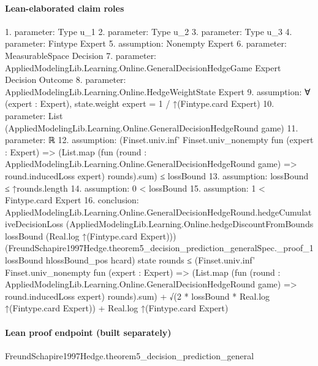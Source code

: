 \documentclass[10pt]{article}
\begin{document}
\paragraph{Lean-elaborated claim roles}\begin{ReviewVerbatim}
1. parameter: Type u_1
2. parameter: Type u_2
3. parameter: Type u_3
4. parameter: Fintype Expert
5. assumption: Nonempty Expert
6. parameter: MeasurableSpace Decision
7. parameter: AppliedModelingLib.Learning.Online.GeneralDecisionHedgeGame Expert Decision Outcome
8. parameter: AppliedModelingLib.Learning.Online.HedgeWeightState Expert
9. assumption: ∀ (expert : Expert), state.weight expert = 1 / ↑(Fintype.card Expert)
10. parameter: List (AppliedModelingLib.Learning.Online.GeneralDecisionHedgeRound game)
11. parameter: ℝ
12. assumption: (Finset.univ.inf' Finset.univ_nonempty fun (expert : Expert) =>
    (List.map
        (fun (round : AppliedModelingLib.Learning.Online.GeneralDecisionHedgeRound game) => round.inducedLoss expert)
        rounds).sum) ≤
  lossBound
13. assumption: lossBound ≤ ↑rounds.length
14. assumption: 0 < lossBound
15. assumption: 1 < Fintype.card Expert
16. conclusion: AppliedModelingLib.Learning.Online.GeneralDecisionHedgeRound.hedgeCumulativeDecisionLoss
    (AppliedModelingLib.Learning.Online.hedgeDiscountFromBounds lossBound (Real.log ↑(Fintype.card Expert)))
    (FreundSchapire1997Hedge.theorem5_decision_prediction_generalSpec._proof_1 lossBound hlossBound_pos hcard) state
    rounds ≤
  (Finset.univ.inf' Finset.univ_nonempty fun (expert : Expert) =>
        (List.map
            (fun (round : AppliedModelingLib.Learning.Online.GeneralDecisionHedgeRound game) =>
              round.inducedLoss expert)
            rounds).sum) +
      √(2 * lossBound * Real.log ↑(Fintype.card Expert)) +
    Real.log ↑(Fintype.card Expert)
\end{ReviewVerbatim}

\paragraph{Lean proof endpoint (built separately)}\begin{ReviewVerbatim}
FreundSchapire1997Hedge.theorem5_decision_prediction_general
\end{ReviewVerbatim}
\end{document}
